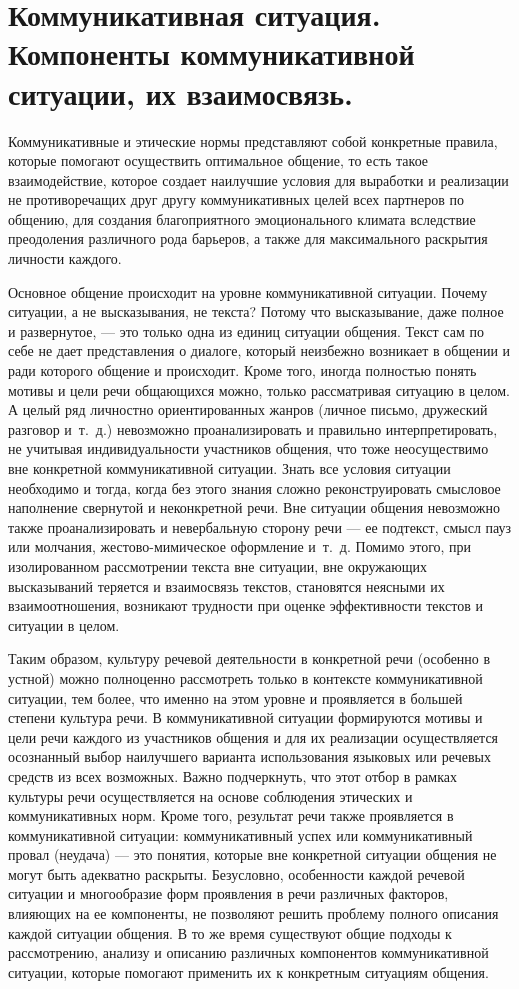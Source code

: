 \section{Коммуникативная ситуация. Компоненты коммуникативной ситуации, их взаимосвязь.}
 

Коммуникативные и этические нормы представляют собой конкретные правила, которые помогают осуществить оптимальное общение, то есть такое взаимодействие, которое создает наилучшие условия для выработки и реализации не противоречащих друг другу коммуникативных целей всех партнеров по общению, для создания благоприятного эмоционального климата вследствие преодоления различного рода барьеров, а также для максимального раскрытия личности каждого.

Основное общение происходит на уровне коммуникативной ситуации. Почему ситуации, а не высказывания, не текста?
Потому что высказывание, даже полное и развернутое, --- это только одна из единиц ситуации общения.
Текст сам по себе не дает представления о диалоге, который неизбежно возникает в общении и ради которого общение и происходит.
Кроме того, иногда полностью понять мотивы и цели речи общающихся можно, только рассматривая ситуацию в целом.
А целый ряд личностно ориентированных жанров (личное письмо, дружеский разговор и~т.~д.) невозможно проанализировать и правильно интерпретировать, не учитывая индивидуальности участников общения, что тоже неосуществимо вне конкретной коммуникативной ситуации. Знать все условия ситуации необходимо и тогда, когда без этого знания сложно реконструировать смысловое наполнение свернутой и неконкретной речи.
Вне ситуации общения невозможно также проанализировать и невербальную сторону речи — ее подтекст, смысл пауз или молчания, жестово-мимическое оформление и~т.~д.
Помимо этого, при изолированном рассмотрении текста вне ситуации, вне окружающих высказываний теряется и взаимосвязь текстов, становятся неясными их взаимоотношения, возникают трудности при оценке эффективности текстов и ситуации в целом.

Таким образом, культуру речевой деятельности в конкретной речи (особенно в устной) можно полноценно рассмотреть только в контексте коммуникативной ситуации, тем более, что именно на этом уровне и проявляется в большей степени культура речи.
В коммуникативной ситуации формируются мотивы и цели речи каждого из участников общения и для их реализации осуществляется осознанный выбор наилучшего варианта использования языковых или речевых средств из всех возможных. Важно подчеркнуть, что этот отбор в рамках культуры речи осуществляется на основе соблюдения этических и коммуникативных норм.
Кроме того, результат речи также проявляется в коммуникативной ситуации: коммуникативный успех или коммуникативный провал (неудача) --- это понятия, которые вне конкретной ситуации общения не могут быть адекватно раскрыты.
Безусловно, особенности каждой речевой ситуации и многообразие форм проявления в речи различных факторов, влияющих на ее компоненты, не позволяют решить проблему полного описания каждой ситуации общения.
В то же время существуют общие подходы к рассмотрению, анализу и описанию различных компонентов коммуникативной ситуации, которые помогают применить их к конкретным ситуациям общения.

